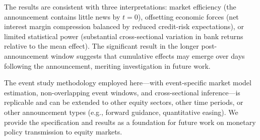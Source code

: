 \documentclass[11pt]{article}
\begin{document}
The results are consistent with three interpretations: market efficiency (the announcement contains little news by $t=0$), offsetting economic forces (net interest margin compression balanced by reduced credit-risk expectations), or limited statistical power (substantial cross-sectional variation in bank returns relative to the mean effect). The significant result in the longer post-announcement window suggests that cumulative effects may emerge over days following the announcement, meriting investigation in future work.

The event study methodology employed here—with event-specific market model estimation, non-overlapping event windows, and cross-sectional inference—is replicable and can be extended to other equity sectors, other time periods, or other announcement types (e.g., forward guidance, quantitative easing). We provide the specification and results as a foundation for future work on monetary policy transmission to equity markets.
\end{document}
